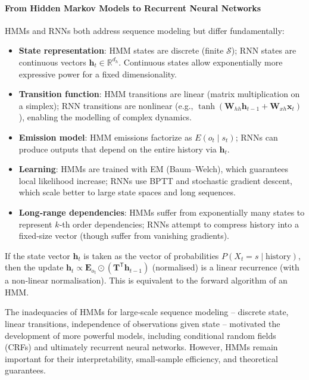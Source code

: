 \documentclass{tufte-handout}
\begin{document}
\paragraph{From Hidden Markov Models to Recurrent Neural Networks}
HMMs and RNNs both address sequence modeling but differ fundamentally:
\begin{itemize}
    \item \textbf{State representation}: HMM states are discrete (finite $\mathcal{S}$); RNN states are continuous vectors $\mathbf{h}_t \in \mathbb{R}^{d_h}$. Continuous states allow exponentially more expressive power for a fixed dimensionality.
    \item \textbf{Transition function}: HMM transitions are linear (matrix multiplication on a simplex); RNN transitions are nonlinear (e.g., $\tanh(\mathbf{W}_{hh}\mathbf{h}_{t-1} + \mathbf{W}_{xh}\mathbf{x}_t)$), enabling the modelling of complex dynamics.
    \item \textbf{Emission model}: HMM emissions factorize as $E(o_t \mid s_t)$; RNNs can produce outputs that depend on the entire history via $\mathbf{h}_t$.
    \item \textbf{Learning}: HMMs are trained with EM (Baum–Welch), which guarantees local likelihood increase; RNNs use BPTT and stochastic gradient descent, which scale better to large state spaces and long sequences.
    \item \textbf{Long‑range dependencies}: HMMs suffer from exponentially many states to represent $k$‑th order dependencies; RNNs attempt to compress history into a fixed‑size vector (though suffer from vanishing gradients).
\end{itemize}

\begin{thm}
    If the state vector $\mathbf{h}_t$ is taken as the vector of probabilities $P(X_t=s \mid \text{history})$, then the update $\mathbf{h}_t \propto \mathbf{E}_{o_t} \odot (\mathbf{T}^{\mathsf{T}} \mathbf{h}_{t-1})$ (normalised) is a linear recurrence (with a non‑linear normalisation). This is equivalent to the forward algorithm of an HMM.
\end{thm}

The inadequacies of HMMs for large‑scale sequence modeling – discrete state, linear transitions, independence of observations given state – motivated the development of more powerful models, including conditional random fields (CRFs) and ultimately recurrent neural networks. However, HMMs remain important for their interpretability, small‑sample efficiency, and theoretical guarantees.
\end{document}
